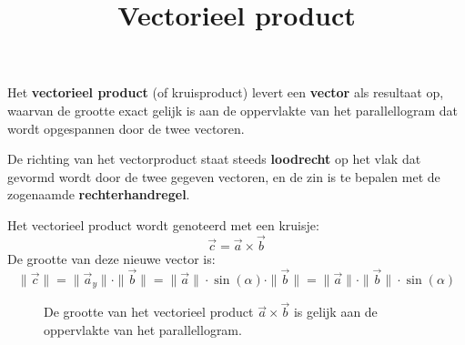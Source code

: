 \documentclass{ximera}
\title{Vectorieel product}
\begin{document}
\begin{abstract}
\end{abstract}
\maketitle


Het \textbf{vectorieel product} (of kruisproduct) levert een \textbf{vector} als resultaat op, waarvan de grootte exact gelijk is aan de oppervlakte van het parallellogram dat wordt opgespannen door de twee vectoren. 

De richting van het vectorproduct staat steeds \textbf{loodrecht} op het vlak dat gevormd wordt door de twee gegeven vectoren, en de zin is te bepalen met de zogenaamde \textbf{rechterhandregel}.

Het vectorieel product wordt genoteerd met een kruisje:
\[ \vec{c} = \vec{a} \times \vec{b} \]
De grootte van deze nieuwe vector is:
\[ \|\vec{c}\| = \| \vec{a}_y \| \cdot \|\vec{b}\| = \|\vec{a}\| \cdot \sin(\alpha) \cdot \|\vec{b}\| = \| \vec{a}\| \cdot \| \vec{b}\| \cdot \sin(\alpha) \]

\begin{figure}[ht!]
    \captionsetup{width=0.85\textwidth}
    \begin{center}
    \end{center}
    \caption{De grootte van het vectorieel product $\vec{a} \times \vec{b}$ is gelijk aan de oppervlakte van het parallellogram.}
    \label{fig:vectorieel_product}
\end{figure}
\end{document}
